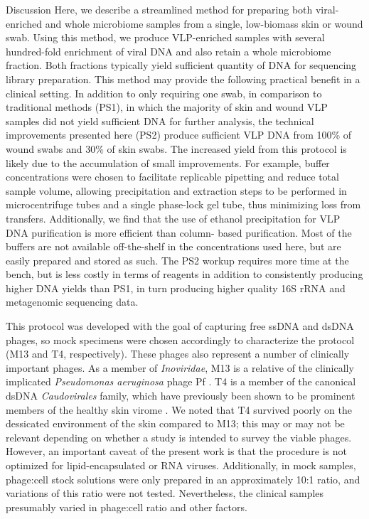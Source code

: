 \documentclass[oneside,12pt,final]{sty/ucthesis-CA2012}
\begin{document}
\begin{mainmatter}
\begin{section}{Discussion}
Here, we describe a streamlined method for preparing both viral-enriched and whole microbiome samples from a single, low-biomass skin or wound swab. Using this method, we produce VLP-enriched samples with several hundred-fold enrichment of viral DNA and also retain a whole microbiome fraction. Both fractions typically yield sufficient quantity of DNA for sequencing library preparation. This method may provide the following practical benefit in a clinical setting. In addition to only requiring one swab, in comparison to traditional methods (PS1), in which the majority of skin and wound VLP samples did not yield sufficient DNA for further analysis, the technical improvements presented here (PS2) produce sufficient VLP DNA from 100\% of wound swabs and 30\% of skin swabs. The increased yield from this protocol is likely due to the accumulation of small improvements. For example, buffer concentrations were chosen to facilitate replicable pipetting and reduce total sample volume, allowing precipitation and extraction steps to be performed in microcentrifuge tubes and a single phase-lock gel tube, thus minimizing loss from transfers. Additionally, we find that the use of ethanol precipitation for VLP DNA purification is more efficient than column- based purification. Most of the buffers are not available off-the-shelf in the concentrations used here, but are easily prepared and stored as such. The PS2 workup requires more time at the bench, but is less costly in terms of reagents in addition to consistently producing higher DNA yields than PS1, in turn producing higher quality 16S rRNA and metagenomic sequencing data.

This protocol was developed with the goal of capturing free ssDNA and dsDNA phages, so mock specimens were chosen accordingly to characterize the protocol (M13 and T4, respectively). These phages also represent a number of clinically important phages. As a member of \textit{Inoviridae}, M13 is a relative of the clinically implicated \textit{Pseudomonas aeruginosa} phage Pf \cite{RN77}. T4 is a member of the canonical dsDNA \textit{Caudovirales} family, which have previously been shown to be prominent members of the healthy skin virome \cite{RN56}. We noted that T4 survived poorly on the dessicated environment of the skin compared to M13; this may or may not be relevant depending on whether a study is intended to survey the viable phages. However, an important caveat of the present work is that the procedure is not optimized for lipid-encapsulated or RNA viruses. Additionally, in mock samples, phage:cell stock solutions were only prepared in an approximately 10:1 ratio, and variations of this ratio were not tested. Nevertheless, the clinical samples presumably varied in phage:cell ratio and other factors.


\end{section}
\end{mainmatter}
\end{document}
